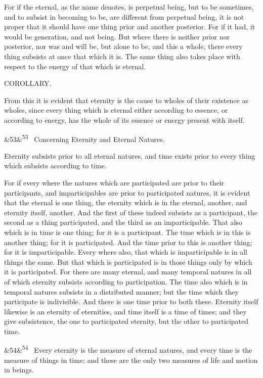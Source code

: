 \documentclass[12pt]{article}
\newcommand{\para}[1][]{\par\noindent\ifx&#1&\else\textsuperscript{\footnotesize #1}~\fi}
\begin{document}
For if the eternal, as the name denotes, is perpetual being, but to be sometimes, and to subsist in becoming to be, are different from perpetual being, it is not proper that it should have one thing prior and another posterior. For if it had, it would be generation, and not being. But where there is neither prior nor posterior, nor was and will be, but alone to be, and this a whole, there every thing subsists at once that which it is. The same thing also takes place with respect to the energy of that which is eternal.

COROLLARY.

From this it is evident that eternity is the cause to wholes of their existence as wholes, since every thing which is eternal either according to essence, or according to energy, has the whole of its essence or energy present with itself.

\para[53] Concerning Eternity and Eternal Natures.

Eternity subsists prior to all eternal natures, and time exists prior to every thing which subsists according to time.

For if every where the natures which are participated are prior to their participants, and imparticipables are prior to participated natures, it is evident that the eternal is one thing, the eternity which is in the eternal, another, and eternity itself, another. And the first of these indeed subsists as a participant, the second as a thing participated, and the third as an imparticipable. That also which is in time is one thing; for it is a participant. The time which is in this is another thing; for it is participated. And the time prior to this is another thing; for it is imparticipable. Every where also, that which is imparticipable is in all things the same. But that which is participated is in those things only by which it is participated. For there are many eternal, and many temporal natures in all of which eternity subsists according to participation. The time also which is in temporal natures subsists in a distributed manner; but the time which they participate is indivisible. And there is one time prior to both these. Eternity itself likewise is an eternity of eternities, and time itself is a time of times; and they give subsistence, the one to participated eternity, but the other to participated time.

\para[54] Every eternity is the measure of eternal natures, and every time is the measure of things in time; and these are the only two measures of life and motion in beings.
\end{document}
